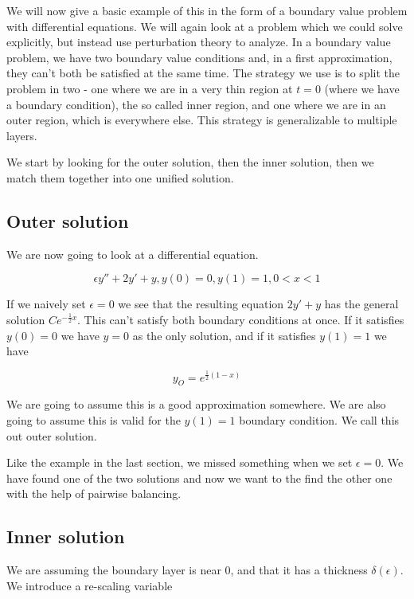 \documentclass[12pt]{article}
\begin{document}
We will now give a basic example of this in the form of a boundary
value problem with differential equations. We will again look at a
problem which we could solve explicitly, but instead use perturbation
theory to analyze. In a boundary value problem, we have two boundary
value conditions and, in a first approximation, they can't both be
satisfied at the same time. The strategy we use is to split the
problem in two - one where we are in a very thin region at $t=0$
(where we have a boundary condition), the so called inner region, and
one where we are in an outer region, which is everywhere else. This
strategy is generalizable to multiple layers.

We start by looking for the outer solution, then the inner solution,
then we match them together into one unified solution.

\subsection{Outer solution}

We are now going to look at a differential equation.

\begin{equation}
\epsilon y'' + 2 y' + y, y(0)=0, y(1)=1, 0 < x < 1
\end{equation}

If we naively set $\epsilon = 0$ we see that the resulting equation $2 y' + y$
has the general solution $C e^{- \frac{1}{2}x}$. This can't satisfy both
boundary conditions at once. If it satisfies $y(0)=0$ we have $y=0$ as the only
solution, and if it satisfies $y(1)=1$ we have

\begin{equation}
y_O=e^{\frac{1}{2} (1 - x)}
\end{equation}

We are going to assume this is a good approximation somewhere. We are also going
to assume this is valid for the $y(1)=1$ boundary condition. We call this out
outer solution.

Like the example in the last section, we missed something when we set $\epsilon
= 0$. We have found one of the two solutions and now we want to the find the
other one with the help of pairwise balancing.

\subsection{Inner solution}

We are assuming the boundary layer is near 0, and that it has a thickness
$\delta(\epsilon)$. We introduce a re-scaling variable
\end{document}
